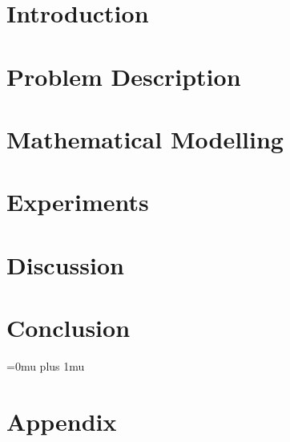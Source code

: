 




\sloppy
{}


\cleardoublepage

\date{\today}
\cleardoublepage

\tableofcontents

\cleardoublepage



\chapter{Introduction}\label{ch:introduction}

\clearpage

\chapter{Problem Description}\label{ch:problemdesc}


\clearpage

\chapter{Mathematical Modelling}\label{ch:mathematicalmodelling}

\clearpage

\chapter{Experiments}\label{ch:lab}


\clearpage
\chapter{Discussion}


\clearpage
\chapter{Conclusion}


\clearpage
\Urlmuskip=0mu plus 1mu\relax
\sloppy

{}

\chapter{Appendix}\label{ch:appendix}




